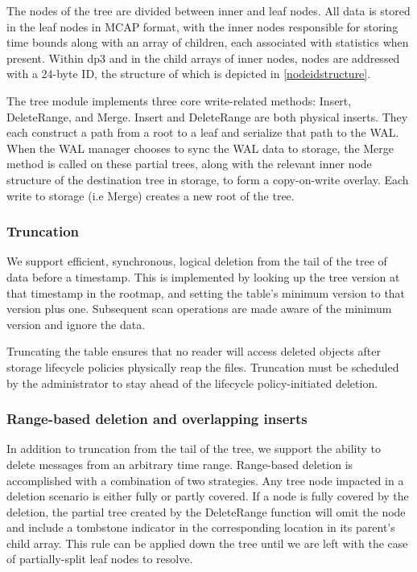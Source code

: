 \documentclass[9pt,twocolumn]{article}
\begin{document}
    The nodes of the tree are divided between inner and leaf nodes. All data is
    stored in the leaf nodes in MCAP format, with the inner nodes responsible for
    storing time bounds along with an array of children, each associated with
    statistics when present. Within dp3 and in the child arrays of inner nodes,
    nodes are addressed with a 24-byte ID, the structure of which is depicted in
    \autoref{nodeidstructure}.

    The tree module implements three core write-related methods: Insert,
    DeleteRange, and Merge. Insert and DeleteRange are both physical inserts.
    They each construct a path from a root to a leaf and serialize that path to
    the WAL.  When the WAL manager chooses to sync the WAL data to storage, the
    Merge method is called on these partial trees, along with the relevant
    inner node structure of the destination tree in storage, to form a
    copy-on-write overlay. Each write to storage (i.e Merge) creates a new root
    of the tree.

    \subsubsection{Truncation}
    We support efficient, synchronous, logical deletion from the tail of the tree
    of data before a timestamp. This is implemented by looking up the tree version
    at that timestamp in the rootmap, and setting the table’s minimum version to
    that version plus one. Subsequent scan operations are made aware of the minimum
    version and ignore the data.

    Truncating the table ensures that no reader will access deleted objects after
    storage lifecycle policies physically reap the files. Truncation must be
    scheduled by the administrator to stay ahead of the lifecycle policy-initiated
    deletion.

    \subsubsection{Range-based deletion and overlapping inserts}
    In addition to truncation from the tail of the tree, we support the ability to
    delete messages from an arbitrary time range. Range-based deletion is
    accomplished with a combination of two strategies. Any tree node impacted in a
    deletion scenario is either fully or partly covered. If a node is fully covered
    by the deletion, the partial tree created by the DeleteRange function will omit
    the node and include a tombstone indicator in the corresponding location in its
    parent’s child array. This rule can be applied down the tree until we are left
    with the case of partially-split leaf nodes to resolve.
\end{document}
